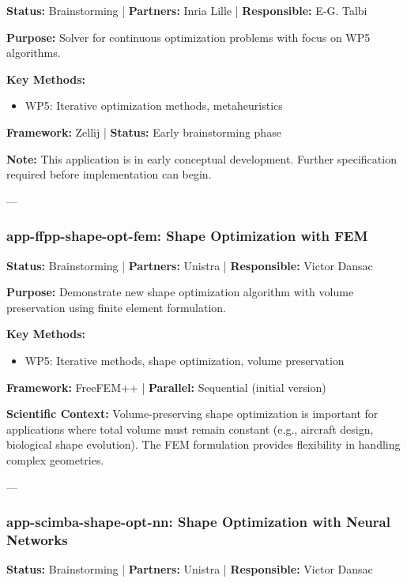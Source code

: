 \textbf{Status:} Brainstorming | \textbf{Partners:} Inria Lille | \textbf{Responsible:} E-G. Talbi

\textbf{Purpose:} Solver for continuous optimization problems with focus on WP5 algorithms.

\textbf{Key Methods:}
\begin{itemize}
\item WP5: Iterative optimization methods, metaheuristics
\end{itemize}

\textbf{Framework:} Zellij | \textbf{Status:} Early brainstorming phase

\textbf{Note:} This application is in early conceptual development. Further specification required before implementation can begin.

---

\subsubsection{app-ffpp-shape-opt-fem: Shape Optimization with FEM}
\label{sec:app:specs:app-ffpp-shape-opt-fem}

\textbf{Status:} Brainstorming | \textbf{Partners:} Unistra | \textbf{Responsible:} Victor Dansac

\textbf{Purpose:} Demonstrate new shape optimization algorithm with volume preservation using finite element formulation.

\textbf{Key Methods:}
\begin{itemize}
\item WP5: Iterative methods, shape optimization, volume preservation
\end{itemize}

\textbf{Framework:} FreeFEM++ | \textbf{Parallel:} Sequential (initial version)

\textbf{Scientific Context:} Volume-preserving shape optimization is important for applications where total volume must remain constant (e.g., aircraft design, biological shape evolution). The FEM formulation provides flexibility in handling complex geometries.

---

\subsubsection{app-scimba-shape-opt-nn: Shape Optimization with Neural Networks}
\label{sec:app:specs:app-scimba-shape-opt-nn}

\textbf{Status:} Brainstorming | \textbf{Partners:} Unistra | \textbf{Responsible:} Victor Dansac

